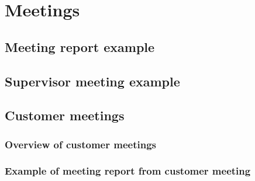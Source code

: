 \chapter{Meetings}
\section{Meeting report example}


\section{Supervisor meeting example}
\section{Customer meetings}
\subsection{Overview of customer meetings}
\subsection{Example of meeting report from customer meeting}